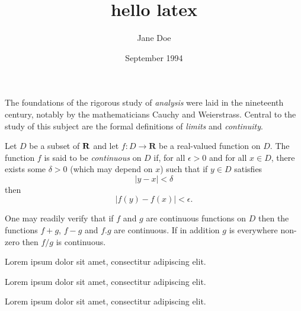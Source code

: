 \documentclass[a4paper,12pt]{article}
\title{hello latex}
\author{Jane Doe}
\date{September 1994}
\begin{document}
	\maketitle

The foundations of the rigorous study of \emph{analysis}
were laid in the nineteenth century, notably by the
mathematicians Cauchy and Weierstrass. Central to the
study of this subject are the formal definitions of
\emph{limits} and \emph{continuity}.

Let $D$ be a subset of $\bf R$ and let
$f \colon D \to \mathbf{R}$ be a real-valued function on
$D$. The function $f$ is said to be \emph{continuous} on
$D$ if, for all $\epsilon > 0$ and for all $x \in D$,
there exists some $\delta > 0$ (which may depend on $x$)
such that if $y \in D$ satisfies
\[ |y - x| < \delta \]
then
\[ |f(y) - f(x)| < \epsilon. \]

One may readily verify that if $f$ and $g$ are continuous
functions on $D$ then the functions $f+g$, $f-g$ and
$f.g$ are continuous. If in addition $g$ is everywhere
non-zero then $f/g$ is continuous.

Lorem ipsum dolor sit amet, consectitur adipiscing elit.
 
\renewcommand*\rmdefault{ppl}\normalfont\upshape
Lorem ipsum dolor sit amet, consectitur adipiscing elit. %
 
\renewcommand*\rmdefault{iwona}\normalfont\upshape
Lorem ipsum dolor sit amet, consectitur adipiscing elit. %
\end{document}
